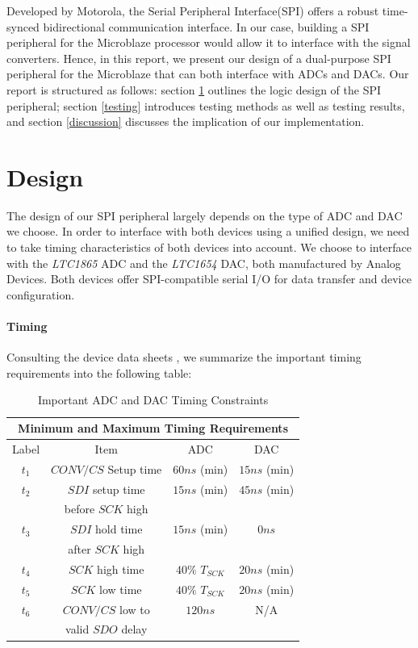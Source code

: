 \documentclass[conference]{IEEEtran}
\begin{document}
Developed by Motorola, the Serial Peripheral Interface(SPI) \cite{b2} offers a robust time-synced bidirectional communication interface. In our case, building a SPI peripheral for the Microblaze\textregistered{} processor would allow it to interface with the signal converters. Hence, in this report, we present our design of a dual-purpose SPI peripheral for the Microblaze\textregistered{} that can both interface with ADCs and DACs. Our report is structured as follows: section \ref{design} outlines the logic design of the SPI peripheral; section \ref{testing} introduces testing methods as well as testing results, and section \ref{discussion} discusses the implication of our implementation.

\section{Design} \label{design}

The design of our SPI peripheral largely depends on the type of ADC and DAC we choose. In order to interface with both devices using a unified design, we need to take timing characteristics of both devices into account. We choose to interface with the \textit{LTC1865} ADC and the \textit{LTC1654} DAC, both manufactured by Analog Devices. Both devices offer SPI-compatible serial I/O for data transfer and device configuration. 
\paragraph{Timing}Consulting the device data sheets \cite{b3}\cite{b4}, we summarize the important timing requirements into the following table:

\begin{table}[htbp]
\caption{Important ADC and DAC Timing Constraints}
\begin{center}
\begin{tabular}{|c|c|c|c|}
\hline
\multicolumn{4}{|c|}{\textbf{Minimum and Maximum Timing Requirements}}\\
\hline
Label & Item & ADC & DAC\\
\hline
$t_1$ & $CONV/CS$ Setup time& $60ns$ (min) & $15ns$ (min)\\
\hline
$t_2$ & $SDI$ setup time& $15ns$ (min)& $45ns$ (min)\\
    &  before $SCK$ high & & \\
\hline
$t_3$ & $SDI$ hold time & $15ns$ (min) & $0ns$\\
    & after $SCK$ high  & & \\
\hline
$t_4$ & $SCK$ high time & $40\%$ $T_{SCK}$ & $20ns$ (min)\\
\hline
$t_5$ & $SCK$ low time & $40\%$ $T_{SCK}$ & $20ns$ (min)\\
\hline
$t_6$ & $CONV/CS$ low to & $120ns$ & N/A\\
    & valid $SDO$ delay & & \\
\hline
\end{tabular}
\label{software_timing}
\end{center}
\end{table}
\end{document}
